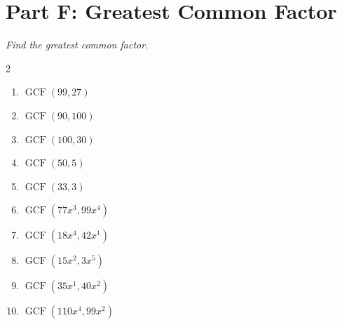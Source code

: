 \documentclass[11pt]{article}
\begin{document}
\section*{Part F: Greatest Common Factor}
\noindent\textit{Find the greatest common factor.}
\begin{multicols}{2}
\begin{enumerate}
  \item $\operatorname{GCF}\left(99, 27\right)$
  \vspace{1.1cm}
  \item $\operatorname{GCF}\left(90, 100\right)$
  \vspace{1.1cm}
  \item $\operatorname{GCF}\left(100, 30\right)$
  \vspace{1.1cm}
  \item $\operatorname{GCF}\left(50, 5\right)$
  \vspace{1.1cm}
  \item $\operatorname{GCF}\left(33, 3\right)$
  \vspace{1.1cm}
  \item $\operatorname{GCF}\left(77x^{3}, 99x^{4}\right)$
  \vspace{1.1cm}
  \item $\operatorname{GCF}\left(18x^{4}, 42x^{1}\right)$
  \vspace{1.1cm}
  \item $\operatorname{GCF}\left(15x^{2}, 3x^{5}\right)$
  \vspace{1.1cm}
  \item $\operatorname{GCF}\left(35x^{1}, 40x^{2}\right)$
  \vspace{1.1cm}
  \item $\operatorname{GCF}\left(110x^{4}, 99x^{2}\right)$
  \vspace{1.1cm}
\end{enumerate}
\end{multicols}
\end{document}
